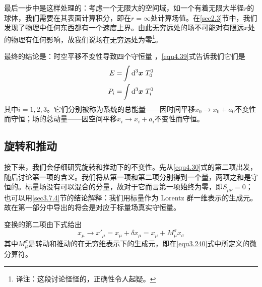 最后一步中是这样处理的：考虑一个无限大的空间域，如一个有着无限大半径$r$的球体，我们需要在其表面计算积分，即在$r=\infty$处计算场值。在\ref{sec2.3}节中，我们发现了物理中任何东西都有一个速度上界。由此无穷远处的场不可能对有限远$x$处的物理有任何影响，故我们说场在无穷远处为零\footnote{译注：这段讨论怪怪的，正确性令人起疑。}。

最终的结论是：时空平移不变性导致四个守恒量%
%
，\eqref{equ4.39}式告诉我们它们是
\begin{align}
E =& \int\mathrm d^3\bm{x}~T_0^0 \label{equ4.40}\\
P_i =& \int\mathrm d^3\bm{x}~T_i^0 \label{equ4.41}
\end{align}
其中$i=1,2,3$。它们分别被称为系统的总能量——因时间平移$x_0\rightarrow x_0+a_0$不变性而守恒；场的总动量——因空间平移$x_i\rightarrow x_i+a_i$不变性而守恒。

\subsection{旋转和推动}\label{sec4.5.3}
接下来，我们会仔细研究旋转和推动下的不变性。先从\eqref{equ4.30}式的第二项出发，随后讨论第一项的含义。我们将从第一项和第二项分别得到一个量，两项之和是守恒的。标量场没有可以混合的分量，故对于它而言第一项始终为零，即$S_{\mu\nu}=0$；也可以用\ref{sec3.7.4}节的结论解释：我们用标量作为 Lorentz 群一维表示的生成元。故在第一部分中导出的将会是对应于标量场真实守恒量。

变换的第二项由下式给出
\[
x_\mu \rightarrow {x'}_\mu = x_\mu + \delta x_\mu = x_\mu + M_\mu^\sigma x_\sigma
\]
其中$M_\mu^\sigma$是转动和推动的在无穷维表示下的生成元，即在\eqref{equ3.240}式中所定义的微分算符。

